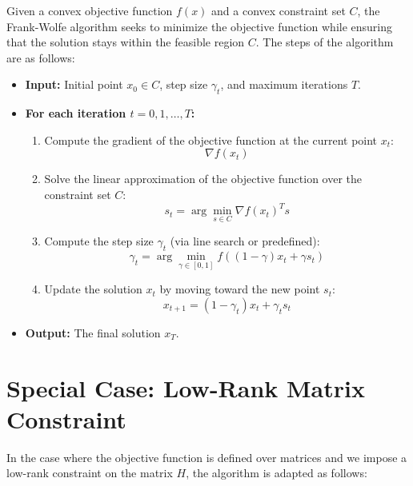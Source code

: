 \documentclass{article}
\begin{document}
Given a convex objective function \( f(x) \) and a convex constraint set \( C \), the Frank-Wolfe algorithm seeks to minimize the objective function while ensuring that the solution stays within the feasible region \( C \). The steps of the algorithm are as follows:

\begin{itemize}
    \item \textbf{Input:} Initial point \( x_0 \in C \), step size \( \gamma_t \), and maximum iterations \( T \).
    \item \textbf{For each iteration \( t = 0, 1, \dots, T \):}
    \begin{enumerate}
        \item Compute the gradient of the objective function at the current point \( x_t \):
        \[
        \nabla f(x_t)
        \]
        
        \item Solve the linear approximation of the objective function over the constraint set \( C \):
        \[
        s_t = \arg\min_{s \in C} \nabla f(x_t)^T s
        \]
        
        \item Compute the step size \( \gamma_t \) (via line search or predefined):
        \[
        \gamma_t = \arg\min_{\gamma \in [0,1]} f((1 - \gamma) x_t + \gamma s_t)
        \]
        
        \item Update the solution \( x_t \) by moving toward the new point \( s_t \):
        \[
        x_{t+1} = (1 - \gamma_t) x_t + \gamma_t s_t
        \]
    \end{enumerate}
    \item \textbf{Output:} The final solution \( x_T \).
\end{itemize}

\section*{Special Case: Low-Rank Matrix Constraint}

In the case where the objective function is defined over matrices and we impose a low-rank constraint on the matrix \( H \), the algorithm is adapted as follows:
\end{document}
